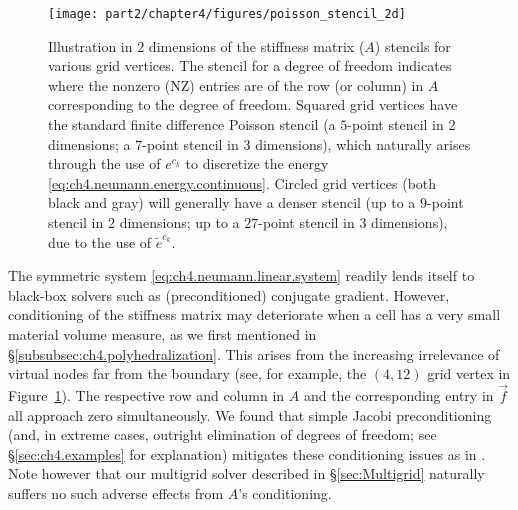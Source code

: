 \newlength\figheightchivpoissonstencil
\setlength{}
\begin{figure}[htbp]
\begin{center}
\texttt{[image: part2/chapter4/figures/poisson\_stencil\_2d]}
\caption{Illustration in $2$ dimensions of the stiffness matrix ($A$) stencils for various grid vertices. The stencil for a degree of freedom indicates where the nonzero (NZ) entries are of the row (or column) in $A$ corresponding to the degree of freedom. Squared grid vertices have the standard finite difference Poisson stencil (a $5$-point stencil in $2$ dimensions; a $7$-point stencil in $3$ dimensions), which naturally arises through the use of $e^{c_k}$ to discretize the energy \eqref{eq:ch4.neumann.energy.continuous}. Circled grid vertices (both black and gray) will generally have a denser stencil (up to a $9$-point stencil in $2$ dimensions; up to a $27$-point stencil in $3$ dimensions), due to the use of $\tilde{e}^{c_k}$.}
\label{fig:ch4.poisson.stencil}
\end{center}
\end{figure}

The symmetric system \eqref{eq:ch4.neumann.linear.system} readily lends itself to black-box solvers such as (preconditioned) conjugate gradient. However, conditioning of the stiffness matrix may deteriorate when a cell has a very small material volume measure, as we first mentioned in \S\ref{subsubsec:ch4.polyhedralization}. This arises from the increasing irrelevance of virtual nodes far from the boundary (see, for example, the $(4,12)$ grid vertex in Figure~\ref{fig:ch4.poisson.stencil}). The respective row and column in $A$ and the corresponding entry in $\vec{f}$ all approach zero simultaneously. We found that simple Jacobi preconditioning (and, in extreme cases, outright elimination of degrees of freedom; see \S\ref{sec:ch4.examples} for explanation) mitigates these conditioning issues as in \cite{Bedrossian10}. Note however that our multigrid solver described in \S\ref{sec:Multigrid} naturally suffers no such adverse effects from $A$'s conditioning.

